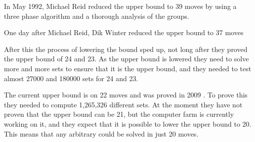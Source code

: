 In May 1992, Michael Reid reduced the upper bound to 39 moves by using a three phase algorithm and a thorough analysis of the groups.

One day after Michael Reid, Dik Winter reduced the upper bound to 37 moves

\begin{comment}
The progression greatly accelerated when that set solver proved the first upper bound of 25 moves. This was done on home computers from October 2007 to March 2008. They only needed to solve 6000 sets, but after this they got contacted by John Welborn from Sony Pictures Imageworks and he offered a lot of idle computers from a computer farm to help on the project. 
\end{comment}
After this the process of lowering the bound sped up, not long after they proved the upper bound of 24 and 23. As the upper bound is lowered they need to solve more and more sets to ensure that it is the upper bound, and they needed to test almost 27000 and 180000 sets for 24 and 23. 


The current upper bound is on 22 moves and was proved in 2009 \cite{rokicki09}. To prove this they needed to compute 1,265,326 different sets. At the moment they have not proven that the upper bound can be 21, but the computer farm is currently working on it, and they expect that it is possible to lower the upper bound to 20. This means that any arbitrary \rubik{} could be solved in just 20 moves.
